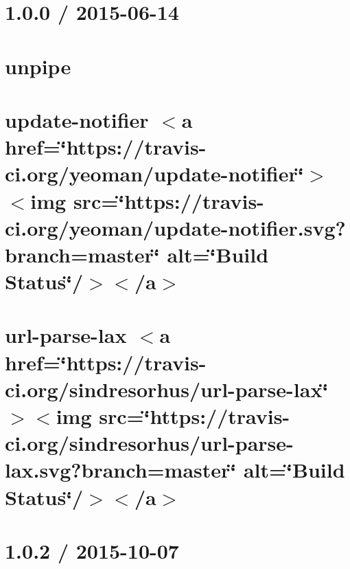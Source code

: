 \let\mypdfximage\pdfximage\def\pdfximage{\immediate\mypdfximage}\documentclass[twoside]{book}
\newcommand{\+}{\discretionary{\mbox{\scriptsize$\hookleftarrow$}}{}{}}
\begin{document}
\chapter{1.0.0 / 2015-\/06-\/14}
\label{md__c_1__git_hub__p_r_o_y_e_c_t_o-_i_i_i-_g_o_t_rest-api_node_modules_unpipe__h_i_s_t_o_r_y}

\chapter{unpipe}
\label{md__c_1__git_hub__p_r_o_y_e_c_t_o-_i_i_i-_g_o_t_rest-api_node_modules_unpipe__r_e_a_d_m_e}

\chapter{update-\/notifier $<$a href=\char`\"{}https\+://travis-\/ci.\+org/yeoman/update-\/notifier\char`\"{}$>$$<$img src=\char`\"{}https\+://travis-\/ci.\+org/yeoman/update-\/notifier.\+svg?branch=master\char`\"{} alt=\char`\"{}\+Build Status\char`\"{}/$>$$<$/a$>$}
\label{md__c_1__git_hub__p_r_o_y_e_c_t_o-_i_i_i-_g_o_t_rest-api_node_modules_update-notifier_readme}

\chapter{url-\/parse-\/lax $<$a href=\char`\"{}https\+://travis-\/ci.\+org/sindresorhus/url-\/parse-\/lax\char`\"{}$>$$<$img src=\char`\"{}https\+://travis-\/ci.\+org/sindresorhus/url-\/parse-\/lax.\+svg?branch=master\char`\"{} alt=\char`\"{}\+Build Status\char`\"{}/$>$$<$/a$>$}
\label{md__c_1__git_hub__p_r_o_y_e_c_t_o-_i_i_i-_g_o_t_rest-api_node_modules_url-parse-lax_readme}

\chapter{1.0.2 / 2015-\/10-\/07}
\label{md__c_1__git_hub__p_r_o_y_e_c_t_o-_i_i_i-_g_o_t_rest-api_node_modules_util-deprecate__history}

\end{document}

